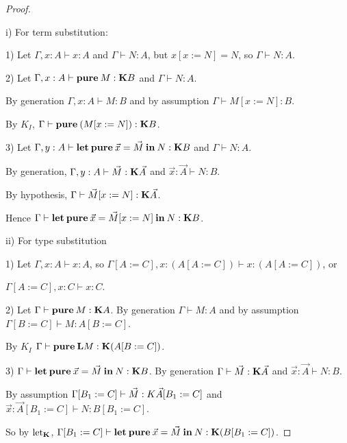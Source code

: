 \documentclass[a4paper]{article}
\begin{document}
\begin{proof}

$ $

i) For term substitution:

\vspace{\baselineskip}

1) Let $\Gamma, x : A \vdash x : A$ and $\Gamma \vdash N : A$, but $x [x := N] = N$, so $\Gamma \vdash N : A$.

2) Let $\Gamma, x : A \vdash {\bf pure \:} M : {\bf K}B$ and $\Gamma \vdash N : A$.

By generation $\Gamma, x : A \vdash M : B$ and by assumption $\Gamma \vdash M [x := N] : B$.

By $K_I$, $\Gamma \vdash {\bf pure \:} (M [x := N]) : {\bf K}B$.

3) Let $\Gamma, y : A \vdash {\bf let \: pure \:} \vec{x} = \vec{M} {\: \bf in \:} N : {\bf K} B$ and $\Gamma \vdash N : A$.

By generation, $\Gamma, y : A \vdash \vec{M} : {\bf K} \vec{A}$ and $\vec{x} : \vec{A} \vdash N : B$.

By hypothesis, $\Gamma \vdash \vec{M}[x := N] : {\bf K} \vec{A}$.

Hence $\Gamma \vdash {\bf let \: pure \:} \vec{x} = \vec{M}[x := N] {\: \bf in \:} N : {\bf K} B$.

\vspace{\baselineskip}

ii) For type substitution

\vspace{\baselineskip}

1) Let $\Gamma, x : A \vdash x : A$, so $\Gamma [A := C], x : (A[A := C]) \vdash x : (A[A := C])$, or

$\Gamma [A := C], x : C \vdash x : C$.

2) Let $\Gamma \vdash {\bf pure \:} M : {\bf K}A$. By generation $\Gamma \vdash M : A$ and by assumption $\Gamma [B := C] \vdash M : A[B := C]$.

By $K_I$ $\Gamma \vdash {\bf pure \:L} M : {\bf K}(A[B := C])$.

3) $\Gamma \vdash {\bf let \: pure \:} \vec{x} = \vec{M} {\: \bf in \:} N : {\bf K}B$. By generation $\Gamma \vdash \vec{M} : {\bf K}\vec{A}$ and $\vec{x} : \vec{A} \vdash N : B$.

By assumption $\Gamma [B_1 := C] \vdash \vec{M} : {\bf }{K}\vec{A}[B_1 := C]$ and $\vec{x} : \vec{A}[B_1 := C] \vdash N : B[B_1 := C]$.

So by $\text{let}_{{\bf K}}$, $\Gamma [B_1 := C] \vdash {\bf let \: pure \:} \vec{x} = \vec{M} {\: \bf in \:} N : {\bf K}(B[B_1 := C])$. 

\end{proof}
\end{document}
